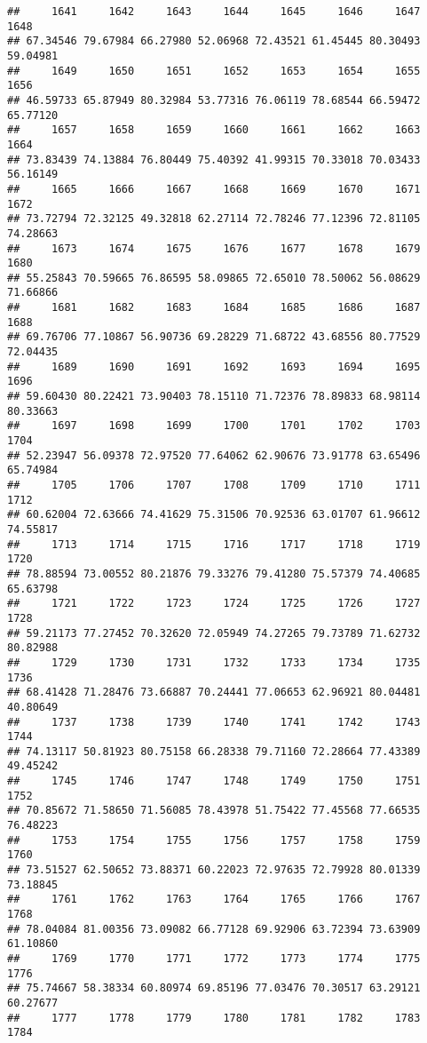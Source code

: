 \documentclass[
]{article}
\begin{document}
\begin{verbatim}
##     1641     1642     1643     1644     1645     1646     1647     1648 
## 67.34546 79.67984 66.27980 52.06968 72.43521 61.45445 80.30493 59.04981 
##     1649     1650     1651     1652     1653     1654     1655     1656 
## 46.59733 65.87949 80.32984 53.77316 76.06119 78.68544 66.59472 65.77120 
##     1657     1658     1659     1660     1661     1662     1663     1664 
## 73.83439 74.13884 76.80449 75.40392 41.99315 70.33018 70.03433 56.16149 
##     1665     1666     1667     1668     1669     1670     1671     1672 
## 73.72794 72.32125 49.32818 62.27114 72.78246 77.12396 72.81105 74.28663 
##     1673     1674     1675     1676     1677     1678     1679     1680 
## 55.25843 70.59665 76.86595 58.09865 72.65010 78.50062 56.08629 71.66866 
##     1681     1682     1683     1684     1685     1686     1687     1688 
## 69.76706 77.10867 56.90736 69.28229 71.68722 43.68556 80.77529 72.04435 
##     1689     1690     1691     1692     1693     1694     1695     1696 
## 59.60430 80.22421 73.90403 78.15110 71.72376 78.89833 68.98114 80.33663 
##     1697     1698     1699     1700     1701     1702     1703     1704 
## 52.23947 56.09378 72.97520 77.64062 62.90676 73.91778 63.65496 65.74984 
##     1705     1706     1707     1708     1709     1710     1711     1712 
## 60.62004 72.63666 74.41629 75.31506 70.92536 63.01707 61.96612 74.55817 
##     1713     1714     1715     1716     1717     1718     1719     1720 
## 78.88594 73.00552 80.21876 79.33276 79.41280 75.57379 74.40685 65.63798 
##     1721     1722     1723     1724     1725     1726     1727     1728 
## 59.21173 77.27452 70.32620 72.05949 74.27265 79.73789 71.62732 80.82988 
##     1729     1730     1731     1732     1733     1734     1735     1736 
## 68.41428 71.28476 73.66887 70.24441 77.06653 62.96921 80.04481 40.80649 
##     1737     1738     1739     1740     1741     1742     1743     1744 
## 74.13117 50.81923 80.75158 66.28338 79.71160 72.28664 77.43389 49.45242 
##     1745     1746     1747     1748     1749     1750     1751     1752 
## 70.85672 71.58650 71.56085 78.43978 51.75422 77.45568 77.66535 76.48223 
##     1753     1754     1755     1756     1757     1758     1759     1760 
## 73.51527 62.50652 73.88371 60.22023 72.97635 72.79928 80.01339 73.18845 
##     1761     1762     1763     1764     1765     1766     1767     1768 
## 78.04084 81.00356 73.09082 66.77128 69.92906 63.72394 73.63909 61.10860 
##     1769     1770     1771     1772     1773     1774     1775     1776 
## 75.74667 58.38334 60.80974 69.85196 77.03476 70.30517 63.29121 60.27677 
##     1777     1778     1779     1780     1781     1782     1783     1784 

\end{verbatim}
\end{document}
